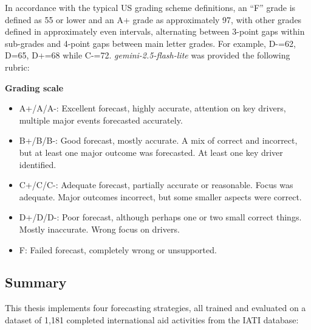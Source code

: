 In accordance with the typical US grading scheme definitions, an ``F'' grade is defined as 55 or lower and an A+ grade as approximately 97, with other grades defined in approximately even intervals, alternating between 3-point gaps within sub-grades and 4-point gaps between main letter grades. For example, D-=62, D=65, D+=68 while C-=72. \emph{gemini-2.5-flash-lite} was provided the following rubric:



\textbf{Grading scale}
\begin{itemize}[noitemsep,topsep=0pt]
\item A+/A/A-: Excellent forecast, highly accurate, attention on key drivers, multiple major events forecasted accurately.
\item B+/B/B-: Good forecast, mostly accurate. A mix of correct and incorrect, but at least one major outcome was forecasted. At least one key driver identified.
\item C+/C/C-: Adequate forecast, partially accurate or reasonable. Focus was adequate. Major outcomes incorrect, but some smaller aspects were correct.
\item D+/D/D-: Poor forecast, although perhaps one or two small correct things. Mostly inaccurate. Wrong focus on drivers.
\item F: Failed forecast, completely wrong or unsupported.
\end{itemize}

\subsection{Summary} \label{sub:methodssummary}

This thesis implements four forecasting strategies, all trained and evaluated on a dataset of 1,181 completed international aid activities from the IATI database:

